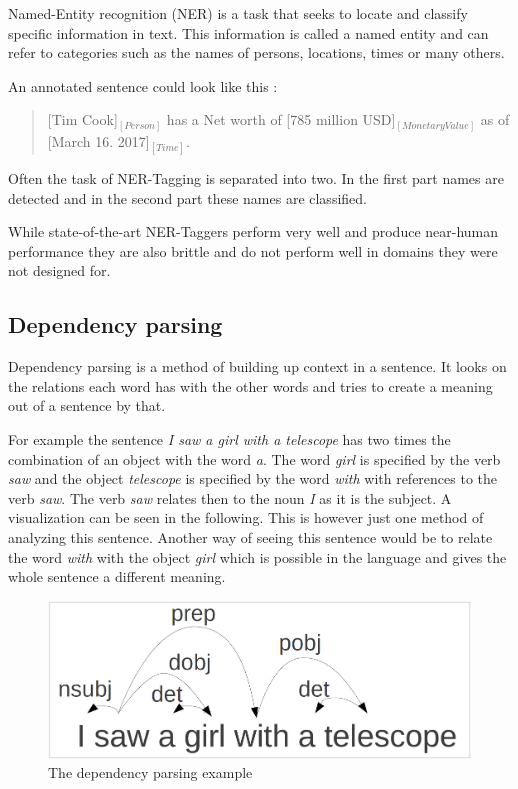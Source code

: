 \documentclass[10pt,a4paper]{article}
\begin{document}
		Named-Entity recognition (NER) is a task that seeks to locate and classify specific information in text. This information is called a named entity and can refer to categories such as the names of persons, locations, times or many others.

		An annotated sentence could look like this :

		\begin{quote}
			[Tim Cook]$_{[Person]}$ has a Net worth of [785 million USD]$_{[Monetary Value]}$ as of [March 16. 2017]$_{[Time]}$.
		\end{quote}
		
		Often the task of NER-Tagging is separated into two. In the first part names are detected and in the second part these names are classified. 
		
		While state-of-the-art NER-Taggers perform very well and produce near-human performance they are also brittle and do not perform well in domains they were not designed for.

		\subsection{Dependency parsing}
		
		Dependency parsing is a method of building up context in a sentence.
		It looks on the relations each word has with the other words and tries to create a meaning out of a sentence by that.
		
		For example the sentence \textit{I saw a girl with a telescope} has two times the combination of an object with the word \textit{a}. 
		The word \textit{girl} is specified by the verb \textit{saw} and the object \textit{telescope} is specified by the word \textit{with} with references to the verb \textit{saw}. 
		The verb \textit{saw} relates then to the noun \textit{I} as it is the subject. 		
		A visualization can be seen in the following.
		This is however just one method of analyzing this sentence.
		Another way of seeing this sentence would be to relate the word \textit{with} with the object \textit{girl} which is possible in the language and gives the whole sentence a different meaning.
		
		\begin{figure}[h]
			\centering
			\includegraphics[width=0.8\linewidth]{data/dependency}
			\caption{The dependency parsing example}
			\label{fig:dependency}
		\end{figure}
		
\end{document}
